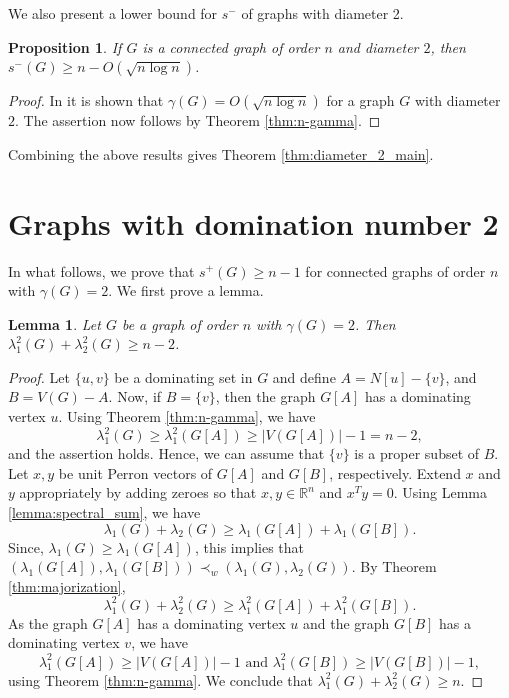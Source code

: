 \documentclass{article}
\newtheorem{lemma}{Lemma}[section]
\newtheorem{proposition}{Proposition}[section]
\begin{document}
We also present a lower bound for $s^-$ of graphs with diameter 2.

\begin{proposition}
If $G$ is a connected graph of order $n$ and diameter $2$, then $s^-(G) \geq n -  O(\sqrt{n \log n})$.
\end{proposition}

\begin{proof}
In \cite{dubickas_diam_2_dom} it is shown that $\gamma(G) = O(\sqrt{n \log n})$ for a graph $G$ with diameter $2$. The assertion now follows by Theorem \ref{thm:n-gamma}.
\end{proof}

Combining the above results gives Theorem \ref{thm:diameter_2_main}.

\section{Graphs with domination number 2}\label{section:domination_2}

In what follows, we prove that $s^+(G) \ge n-1$ for connected graphs of order $n$ with $\gamma(G)=2$. We first prove a lemma.

\begin{lemma}\label{lemma:domination=2_eig}
    Let $G$ be a graph of order $n$ with $\gamma(G)=2$. Then $\lambda_1^2(G)+ \lambda^2_2(G)\ge n-2$. 
\end{lemma}

\begin{proof}
Let $\{u,v\}$ be a dominating set in $G$ and define $A= N[u]-\{v\}$, and $B= V(G) - A$. Now, if $B = \{v\}$, then the graph $G[A]$ has a dominating vertex $u$. Using Theorem \ref{thm:n-gamma}, we have 
\[\lambda_1^2(G) \geq \lambda^2_1(G[A]) \geq |V(G[A])| -1 = n-2,\]
and the assertion holds. Hence, we can assume that $\{v\}$ is a proper subset of $B$. Let $x,y$ be unit Perron vectors of $G[A]$ and $G[B]$, respectively. Extend $x$ and $y$ appropriately by adding zeroes so that $x,y\in \mathbb{R}^n$ and $x^Ty=0$. Using Lemma \ref{lemma:spectral_sum}, we have
\[\lambda_1(G) + \lambda_2(G) \geq \lambda_1(G[A])+ \lambda_1(G[B]).\]
Since, $\lambda_1(G) \geq \lambda_1(G[A])$, this implies that $(\lambda_1(G[A]),\lambda_1(G[B])) \prec_w (\lambda_1(G),\lambda_2(G))$. By Theorem \ref{thm:majorization},
\[\lambda^2_1(G) + \lambda^2_2(G) \geq \lambda^2_1(G[A])+ \lambda^2_1(G[B]).\]
As the graph $G[A]$ has a dominating vertex $u$ and the graph $G[B]$ has a dominating vertex $v$, we have 
\[\lambda^2_1(G[A]) \geq |V(G[A])| -1 \text{ and }\lambda^2_1(G[B]) \geq |V(G[B])| -1,\]
using Theorem \ref{thm:n-gamma}. We conclude that $\lambda_1^2(G) + \lambda_2^2(G)\ge n$. 
\end{proof}
\end{document}
